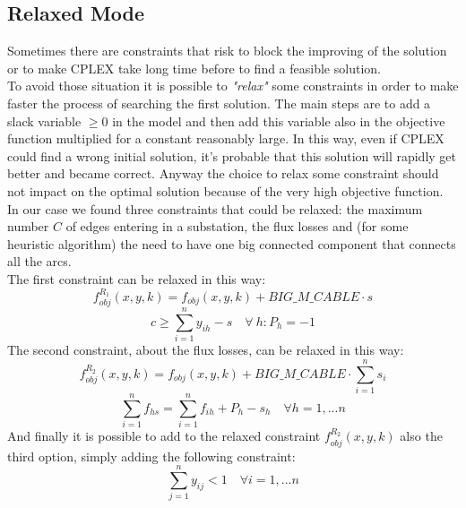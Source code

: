 \subsection{Relaxed Mode}
Sometimes there are constraints that risk to block the improving of the solution or to make \textsc{CPLEX} take long time before to find a feasible solution. \\
To avoid those situation it is possible to \textit{"relax"} some constraints in order to make faster the process of searching the first solution. The main steps are to add a slack variable $\geq 0$ in the model and then add this variable also in the objective function multiplied for a constant reasonably large. In this way, even if \textsc{CPLEX} could find a wrong initial solution, it’s probable that this solution will rapidly get better and became correct. Anyway the choice to relax some constraint should not impact on the optimal solution because of the very high objective function. \\
In our case we found three constraints that could be relaxed: the maximum number $C$ of edges entering in a substation, the flux losses and (for some heuristic algorithm) the need to have one big connected component that connects all the arcs. \\
The first constraint can be relaxed in this way:
\[
f^{R_1}_{obj} (x,y,k) = f_{obj} (x,y,k) + BIG\_M\_CABLE \cdot s
\]
\[
c \geq \sum^n_{i=1} y_{ih} -s \quad \forall \ h : P_h = -1
\]
The second constraint, about the flux losses, can be relaxed in this way:
\[
f^{R_2}_{obj} (x,y,k) = f_{obj} (x,y,k) + BIG\_M\_CABLE \cdot \sum^n_{i=1} s_i
\]
\[
\sum^n_{i=1} f_{hs} = \sum^n_{i=1} f_{ih} + P_h - s_h \quad \forall h = 1, ... n
\]
And finally it is possible to add to the relaxed constraint $f^{R_2}_{obj} (x,y,k)$ also the third option, simply adding the following constraint: 
\[
\sum^n_{j=1} y_{ij} < 1 \quad \forall i = 1, ... n
\]

